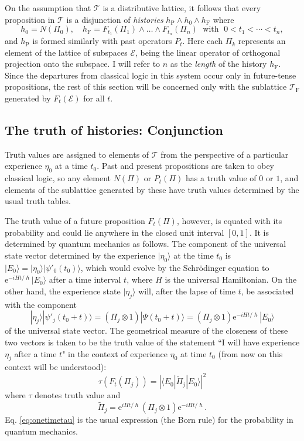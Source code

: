 \documentclass[12pt,a4paper,reqno]{article}
\renewcommand{\(}{\left(}
\renewcommand{\)}{\right)}
\newcommand{\e}{\mbox{e}}
\renewcommand{\hbar}{\hslash}
\newcommand{\E}{\mathcal{E}}
\newcommand{\T}{\mathcal{T}}
\newcommand{\TF}{\mathcal{T}_\text{F}}
\newcommand{\<}{\langle}
\renewcommand{\>}{\rangle}
\newcommand{\be}{\begin{equation}}
\newcommand{\ee}{\end{equation}}
\newcommand{\Pii}{\widetilde{\Pi}}
\theoremstyle{plain} %
\begin{document}
On the assumption that $\T$ is a distributive lattice, it follows that every proposition in $\T$ is a disjunction of \emph{histories} $h_\text{P}\land h_0 \land h_\text{F}$ where
\be\label{history}
h_0 = N(\Pi_0), \quad h_\text{F} = F_{t_1}(\Pi_1)\land \ldots \land F_{t_n}(\Pi_n) \; \text{ with } \; 0 < t_1 < \cdots < t_n,
\ee
and $h_\text{P}$ is formed similarly with past operators $P_t$. Here each $\Pi_k$ represents an element of the lattice of subspaces $\E$, being the linear operator of orthogonal projection onto the subspace. I will refer to $n$ as the \emph{length} of the history $h_\text{F}$. Since the departures from classical logic in this system occur only in future-tense propositions, the rest of this section will be concerned only with the sublattice $\TF$ generated by $F_t(\E)$ for all $t$.

\subsection{The truth of histories: Conjunction}
\label{subsec:truth}

Truth values are assigned to elements of $\T$ from the perspective of a particular experience $\eta_0$ at a time $t_0$. Past and present propositions are taken to obey classical logic, so any element $N(\Pi)$ or $P_t(\Pi)$ has a truth value of $0$ or $1$, and elements of the sublattice generated by these have truth values determined by the usual truth tables. 

The truth value of a future proposition $F_t(\Pi)$, however, is equated with its probability and could lie anywhere in the closed unit interval $[0,1]$. It is determined by quantum mechanics as follows. The component of the universal state vector determined by the experience $|\eta_0\>$ at the time $t_0$ is $|E_0\> = |\eta_0\>|\psi'_0(t_0)\>$, which would evolve by the Schr\"odinger equation to $\e^{-iHt/\hbar}|E_0\>$ after a time interval $t$, where $H$ is the universal Hamiltonian. On the other hand, the experience state $|\eta_j\>$ will, after the lapse of time $t$, be associated with the component
\[
|\eta_j\>|\psi'_j(t_0 + t)\> = (\Pi_j\otimes 1)|\Psi(t_0 + t)\> = (\Pi_j\otimes 1)\e^{-iHt/\hbar}|E_0\>
\]
of the universal state vector. The geometrical measure of the closeness of these two vectors is taken to be the truth value of the statement ``I will have experience $\eta_j$ after a time $t$" in the context of experience $\eta_0$ at time $t_0$ (from now on this context will be understood):
\be\label{eq:onetimetau}
\tau\left(F_t(\Pi_j)\right) = \left|\<E_0|\Pii_j|E_0\>\right|^2
\ee
where $\tau$ denotes truth value and
\[
\Pii_j = \e^{iHt/\hbar}(\Pi_j\otimes 1)\e^{-iHt/\hbar}.
\]
Eq. \eqref{eq:onetimetau} is the usual expression (the Born rule) for the probability in quantum mechanics.
\end{document}
